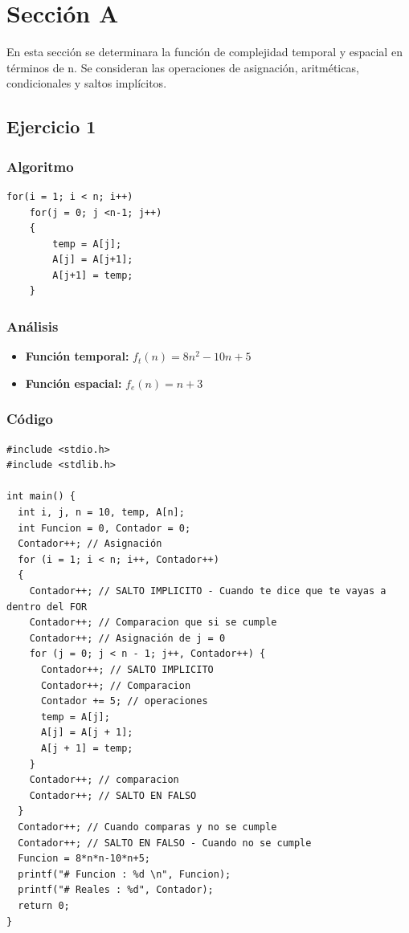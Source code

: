 \documentclass[12pt]{article}
\begin{document}
	\section{Sección A}
	En esta sección se determinara la función de complejidad temporal y espacial en términos de n. Se consideran las operaciones de asignación, aritméticas, condicionales y saltos implícitos.

	    \subsection{Ejercicio 1}
	        \subsubsection{Algoritmo}
	        \begin{lstlisting}[style=Java]
for(i = 1; i < n; i++)
	for(j = 0; j <n-1; j++)
	{
		temp = A[j];
		A[j] = A[j+1];
		A[j+1] = temp;
	}

    		\end{lstlisting}

    		\subsubsection{Análisis}
    			\begin{itemize}
    				\item[\Checkmark] \textbf{Función temporal:} $f_{t}(n) = 8n^{2} - 10n +5$
    				\item[\Checkmark] \textbf{Función espacial:} $f_{e}(n) = n + 3$
    			\end{itemize}
    		\subsubsection{Código}
    		\begin{lstlisting}[style=Java]
#include <stdio.h>
#include <stdlib.h>

int main() {
  int i, j, n = 10, temp, A[n];
  int Funcion = 0, Contador = 0;
  Contador++; // Asignación
  for (i = 1; i < n; i++, Contador++) 
  {
    Contador++; // SALTO IMPLICITO - Cuando te dice que te vayas a dentro del FOR
    Contador++; // Comparacion que si se cumple
    Contador++; // Asignación de j = 0
    for (j = 0; j < n - 1; j++, Contador++) {
      Contador++; // SALTO IMPLICITO
      Contador++; // Comparacion
      Contador += 5; // operaciones
      temp = A[j];
      A[j] = A[j + 1];
      A[j + 1] = temp;
    }
    Contador++; // comparacion
    Contador++; // SALTO EN FALSO
  }
  Contador++; // Cuando comparas y no se cumple
  Contador++; // SALTO EN FALSO - Cuando no se cumple
  Funcion = 8*n*n-10*n+5;
  printf("# Funcion : %d \n", Funcion);
  printf("# Reales : %d", Contador);
  return 0;
}
    		\end{lstlisting}
\end{document}
